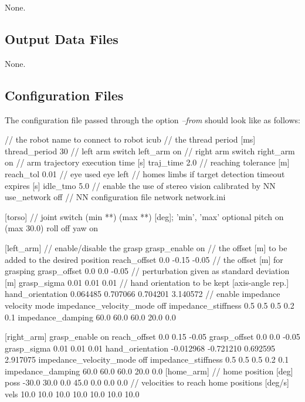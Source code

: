 None.\hypertarget{group__icub__pf3dTracker_out_data_sec}{}\subsection{Output Data Files}\label{group__icub__pf3dTracker_out_data_sec}
None. \hypertarget{group__src__demoYoga_conf_file_sec}{}\subsection{Configuration Files}\label{group__src__demoYoga_conf_file_sec}
The configuration file passed through the option {\itshape --from} should look like as follows\+: 
\begin{DoxyCode}
[general]
\textcolor{comment}{// the robot name to connect to}
robot           icub
\textcolor{comment}{// the thread period [ms]}
thread\_period   30
\textcolor{comment}{// left arm switch}
left\_arm        on
\textcolor{comment}{// right arm switch}
right\_arm       on
\textcolor{comment}{// arm trajectory execution time [s]}
traj\_time       2.0
\textcolor{comment}{// reaching tolerance [m]}
reach\_tol       0.01
\textcolor{comment}{// eye used}
eye             left
\textcolor{comment}{// homes limbs if target detection timeout expires [s]}
idle\_tmo        5.0
\textcolor{comment}{// enable the use of stereo vision calibrated by NN}
use\_network off
\textcolor{comment}{// NN configuration file}
network         network.ini

[torso]
\textcolor{comment}{// joint switch (min **) (max **) [deg]; 'min', 'max' optional}
pitch on  (max 30.0)
roll off
yaw on

[left\_arm]
\textcolor{comment}{// enable/disable the grasp}
grasp\_enable        on
\textcolor{comment}{// the offset [m] to be added to the desired position}
reach\_offset        0.0 -0.15 -0.05
\textcolor{comment}{// the offset [m] for grasping}
grasp\_offset        0.0 0.0 -0.05
\textcolor{comment}{// perturbation given as standard deviation [m]}
grasp\_sigma 0.01 0.01 0.01
\textcolor{comment}{// hand orientation to be kept [axis-angle rep.]}
hand\_orientation 0.064485 0.707066 0.704201 3.140572
\textcolor{comment}{// enable impedance velocity mode}
impedance\_velocity\_mode off
impedance\_stiffness 0.5 0.5 0.5 0.2 0.1
impedance\_damping 60.0 60.0 60.0 20.0 0.0

[right\_arm]
grasp\_enable        on
reach\_offset        0.0 0.15 -0.05
grasp\_offset        0.0 0.0 -0.05
grasp\_sigma         0.01 0.01 0.01
hand\_orientation    -0.012968 -0.721210 0.692595 2.917075
impedance\_velocity\_mode off
impedance\_stiffness 0.5 0.5 0.5 0.2 0.1
impedance\_damping 60.0 60.0 60.0 20.0 0.0
[home\_arm]
\textcolor{comment}{// home position [deg]}
poss    -30.0 30.0 0.0  45.0 0.0  0.0  0.0
\textcolor{comment}{// velocities to reach home positions [deg/s]}
vels    10.0  10.0 10.0 10.0 10.0 10.0 10.0


\end{DoxyCode}
